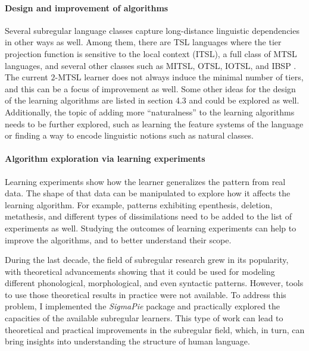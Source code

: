 \paragraph{Design and improvement of algorithms}
Several subregular language classes capture long-distance linguistic dependencies in other ways as well.
Among them, there are TSL languages where the tier projection function is sensitive to the local context (ITSL), a full class of MTSL languages, and several other classes such as MITSL, OTSL, IOTSL, and IBSP \citep{Graf17Phonology,DeSantoGraf19FG}.
The current $2$-MTSL learner does not always induce the minimal number of tiers, and this can be a focus of improvement as well.
Some other ideas for the design of the learning algorithms are listed in section 4.3 and could be explored as well.
Additionally, the topic of adding more ``naturalness'' to the learning algorithms needs to be further explored, such as learning the feature systems of the language or finding a way to encode linguistic notions such as natural classes.


\paragraph{Algorithm exploration via learning experiments}

Learning experiments show how the learner generalizes the pattern from real data.
The shape of that data can be manipulated to explore how it affects the learning algorithm.
For example, patterns exhibiting epenthesis, deletion, metathesis, and different types of dissimilations need to be added to the list of experiments as well.
Studying the outcomes of learning experiments can help to improve the algorithms, and to better understand their scope.

\bigskip\medskip
During the last decade, the field of subregular research grew in its popularity, with theoretical advancements showing that it could be used for modeling different phonological, morphological, and even syntactic patterns.
However, tools to use those theoretical results in practice were not available.
To address this problem, I implemented the \emph{SigmaPie} \href{https://pypi.org/project/SigmaPie/}{\faCube} package and practically explored the capacities of the available subregular learners.
This type of work can lead to theoretical and practical improvements in the subregular field, which, in turn, can bring insights into understanding the structure of human language.
